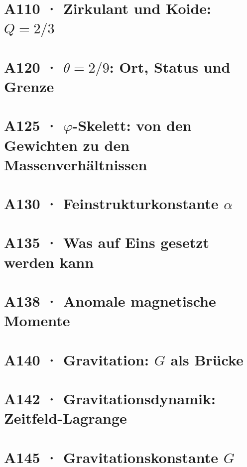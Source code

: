 \documentclass[11pt,twoside,openright]{book}
\begin{document}
\chapter[A110 · Zirkulant und Koide]{A110 · Zirkulant und Koide: $Q=2/3$}


\chapter[A120 · $\theta = 2/9$]{A120 · $\theta=2/9$: Ort, Status und Grenze}


\chapter[A125 · $\varphi$-Skelett]{A125 · $\varphi$-Skelett: von den Gewichten zu den Massenverhältnissen}


\chapter[A130 · Feinstrukturkonstante]{A130 · Feinstrukturkonstante $\alpha$}


\chapter[A135 · Was auf Eins gesetzt werden kann]{A135 · Was auf Eins gesetzt werden kann}


\chapter[A138 · Anomale magnetische Momente]{A138 · Anomale magnetische Momente}


\chapter[A140 · Gravitation: $G$ als Brücke]{A140 · Gravitation: $G$ als Brücke}


\chapter[A142 · Gravitationsdynamik]{A142 · Gravitationsdynamik: Zeitfeld-Lagrange}


\chapter[A145 · Gravitationskonstante]{A145 · Gravitationskonstante $G$}

\end{document}

